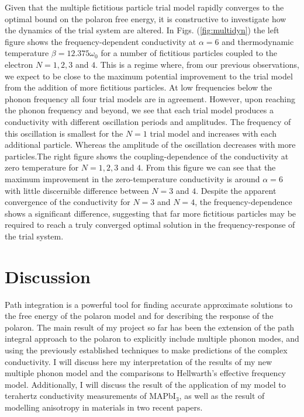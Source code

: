 Given that the multiple fictitious particle trial model rapidly converges to the optimal bound on the polaron free energy, it is constructive to investigate how the dynamics of the trial system are altered. In Figs. (\ref{fig:multidyn}) the left figure shows the frequency-dependent conductivity at $\alpha = 6$ and thermodynamic temperature $\beta = 12.375 \omega_0$ for a number of fictitious particles coupled to the electron $N = 1, 2, 3$ and $4$. This is a regime where, from our previous observations, we expect to be close to the maximum potential improvement to the trial model from the addition of more fictitious particles. At low frequencies below the phonon frequency all four trial models are in agreement. However, upon reaching the phonon frequency and beyond, we see that each trial model produces a conductivity with different oscillation periods and amplitudes. The frequency of this oscillation is smallest for the $N=1$ trial model and increases with each additional particle. Whereas the amplitude of the oscillation decreases with more particles.The right figure shows the coupling-dependence of the conductivity at zero temperature for $N=1, 2,3$ and $4$. From this figure we can see that the maximum improvement in the zero-temperature conductivity is around $\alpha = 6$ with little discernible difference between $N=3$ and $4$. Despite the apparent convergence of the conductivity for $N=3$ and $N=4$, the frequency-dependence shows a significant difference, suggesting that far more fictitious particles may be required to reach a truly converged optimal solution in the frequency-response of the trial system.

\section{Discussion}

Path integration is a powerful tool for finding accurate approximate solutions to the free energy of the polaron model and for describing the response of the polaron. The main result of my project so far has been the extension of the path integral approach to the polaron to explicitly include multiple phonon modes, and using the previously established techniques to make predictions of the complex conductivity. I will discuss here my interpretation of the results of my new multiple phonon model and the comparisons to Hellwarth's effective frequency model. Additionally, I will discuss the result of the application of my model to terahertz conductivity measurements of MAPbI$_3$, as well as the result of modelling anisotropy in materials in two recent papers. 


